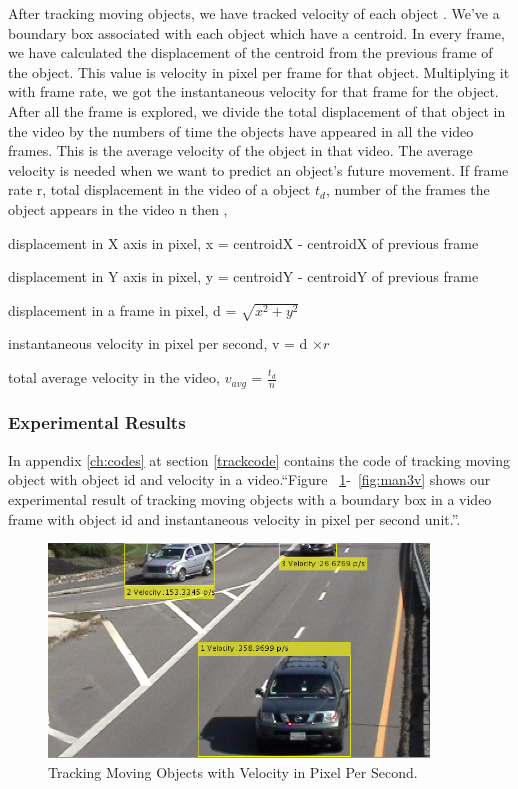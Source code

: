 After tracking moving objects, we have tracked velocity of each object . We've a boundary box associated with each object which have a centroid. In every frame, we have calculated the displacement of the centroid from the previous frame of the object. This value is velocity in  pixel per frame for that object. Multiplying it with frame rate, we got the instantaneous velocity for that frame for the object. After all the frame is explored, we divide the total displacement of that object in the video by the numbers of time the objects have appeared in all the video frames. This is the average velocity of the object in that video. The average velocity is needed when we want to predict an object's future movement. If frame rate r, total displacement in the video of a object $t_d$, number of the frames the object appears in the video n then , 
\newline
\newline
\centerline{displacement in X axis in pixel, x = centroidX - centroidX of previous frame}
\centerline{displacement in Y axis in pixel, y = centroidY - centroidY of previous frame}
\centerline{displacement in a frame in pixel, d = $\sqrt{x^2 + y^2}$}
\centerline{instantaneous velocity in pixel per second, v = d $\times r$}
\centerline{
total average velocity in the video, $v_{avg}$ = $\frac {t_d}{n}$
}

\subsubsection{Experimental Results}
    
In appendix \ref{ch:codes} at section \ref{trackcode} contains the code of tracking moving object with object id and velocity in a video.``Figure ~\ref{fig:car1v}-~\ref{fig:man3v} shows our experimental result of tracking moving objects with a boundary box in a video frame with object id and instantaneous velocity in pixel per second unit.''.

\begin{figure}[H]
  \centering
  \includegraphics[width=0.9\textwidth]{figures/car1v}
  \caption{Tracking Moving Objects with Velocity in Pixel Per Second.}
  \label{fig:car1v}
\end{figure} 

